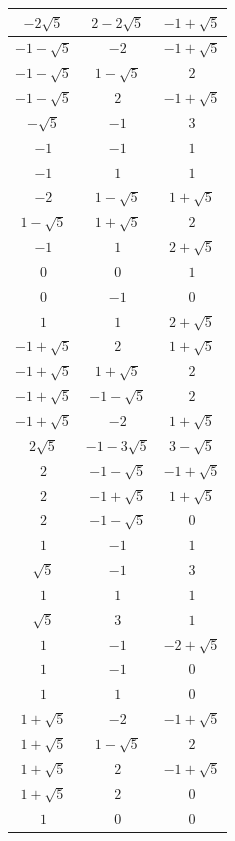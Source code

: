 \documentclass[11pt]{amsart}
\numberwithin{equation}{section}
\begin{document}
\begin{table}[]
    \centering
{\tiny
        \begin{tabular}{|c|c|c|}
        \hline
    
$-2\sqrt{5}$ & $2 - 2\sqrt{5}$ & $-1 + \sqrt{5}$ \\
\hline
$-1 - \sqrt{5}$ & $-2$ & $-1 + \sqrt{5}$ \\
\hline
$-1 - \sqrt{5}$ & $1 - \sqrt{5}$ & $2$ \\
\hline
$-1 - \sqrt{5}$ & $2$ & $-1 + \sqrt{5}$ \\
\hline
$-\sqrt{5}$ & $-1$ & $3$ \\
\hline
$-1$ & $-1$ & $1$ \\
\hline
$-1$ & $1$ & $1$ \\
\hline
$-2$ & $1 - \sqrt{5}$ & $1 + \sqrt{5}$ \\
\hline
$1 - \sqrt{5}$ & $1 + \sqrt{5}$ & $2$ \\
\hline
$-1$ & $1$ & $2 + \sqrt{5}$ \\
\hline
$0$ & $0$ & $1$ \\
\hline
$0$ & $-1$ & $0$ \\
\hline
$1$ & $1$ & $2 + \sqrt{5}$ \\
\hline
$-1 + \sqrt{5}$ & $2$ & $1 + \sqrt{5}$ \\
\hline
$-1 + \sqrt{5}$ & $1 + \sqrt{5}$ & $2$ \\
\hline
$-1 + \sqrt{5}$ & $-1 - \sqrt{5}$ & $2$ \\
\hline
$-1 + \sqrt{5}$ & $-2$ & $1 + \sqrt{5}$ \\
\hline
$2\sqrt{5}$ & $-1 - 3\sqrt{5}$ & $3 - \sqrt{5}$ \\
\hline
$2$ & $-1 - \sqrt{5}$ & $-1 + \sqrt{5}$ \\
\hline
$2$ & $-1 + \sqrt{5}$ & $1 + \sqrt{5}$ \\
\hline
$2$ & $-1 - \sqrt{5}$ & $0$ \\
\hline
$1$ & $-1$ & $1$ \\
\hline
$\sqrt{5}$ & $-1$ & $3$ \\
\hline
$1$ & $1$ & $1$ \\
\hline
$\sqrt{5}$ & $3$ & $1$ \\
\hline
$1$ & $-1$ & $-2 + \sqrt{5}$ \\
\hline
$1$ & $-1$ & $0$ \\
\hline
$1$ & $1$ & $0$ \\
\hline
$1 + \sqrt{5}$ & $-2$ & $-1 + \sqrt{5}$ \\
\hline
$1 + \sqrt{5}$ & $1 - \sqrt{5}$ & $2$ \\
\hline
$1 + \sqrt{5}$ & $2$ & $-1 + \sqrt{5}$ \\
\hline
$1 + \sqrt{5}$ & $2$ & $0$ \\
\hline
$1$ & $0$ & $0$ \\
\hline


\end{tabular}}
\end{table}
\end{document}
